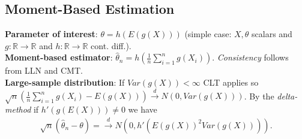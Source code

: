 \subsection{Moment-Based Estimation}
\textbf{Parameter of interest}: $\theta = h(E(g(X)))$ (simple case: $X, \theta$ scalars and $g:\mathbb{R}\to\mathbb{R}$ and $h:\mathbb{R}\to\mathbb{R}$ cont. diff.).\\
\textbf{Moment-based estimator}: $\hat{\theta}_n = h\left(\frac{1}{n}\sum_{i=1}^ng(X_i)\right)$. \emph{Consistency} follows from LLN and CMT. \\
\textbf{Large-sample distribution}: If $Var(g(X))<\infty$ CLT applies so $\sqrt{n}\left(\frac{1}{n}\sum_{i=1}^ng(X_i) - E(g(X))\right)\xrightarrow{d}N(0, Var(g(X)))$. By the \emph{delta-method} if $h'(g(E(X)))\neq0$ we have 
\begin{equation*}
	\begin{split}
		\sqrt{n}(\hat{\theta}_n - \theta) = 
		\xrightarrow{d} N(0, h'(E(g(X))^2Var(g(X)))).
	\end{split}
\end{equation*}
